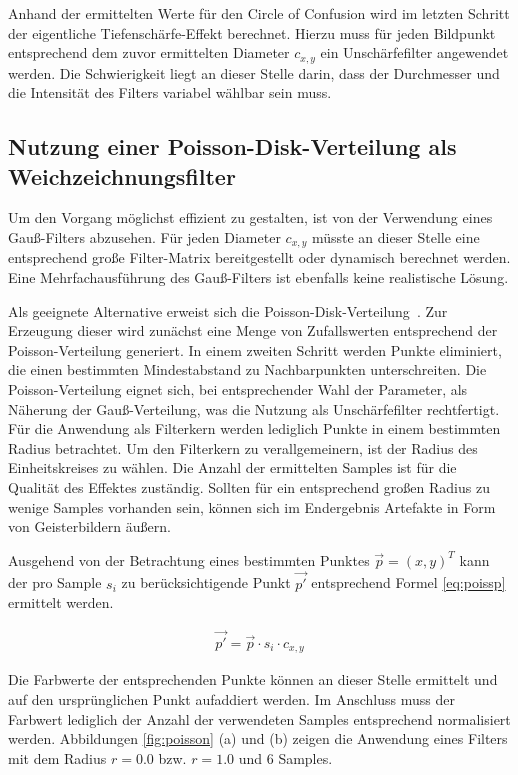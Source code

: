 \documentclass{acmsiggraph}                     %
\begin{document}
Anhand der ermittelten Werte für den Circle of Confusion wird im letzten Schritt der eigentliche Tiefenschärfe-Effekt berechnet. Hierzu muss für jeden Bildpunkt entsprechend dem zuvor ermittelten Diameter $c_{x,y}$ ein Unschärfefilter angewendet werden. Die Schwierigkeit liegt an dieser Stelle darin, dass der Durchmesser und die Intensität des Filters variabel wählbar sein muss.

\subsection{Nutzung einer Poisson-Disk-Verteilung als Weichzeichnungsfilter}

Um den Vorgang möglichst effizient zu gestalten, ist von der Verwendung eines Gauß-Filters abzusehen. Für jeden Diameter $c_{x,y}$ müsste an dieser Stelle eine entsprechend große Filter-Matrix bereitgestellt oder dynamisch berechnet werden. Eine Mehrfachausführung des Gauß-Filters ist ebenfalls keine realistische Lösung.

Als geeignete Alternative erweist sich die Poisson-Disk-Verteilung~\cite{Engel:2004uq}. Zur Erzeugung dieser wird zunächst eine Menge von Zufallswerten entsprechend der Poisson-Verteilung generiert. In einem zweiten Schritt werden Punkte eliminiert, die einen bestimmten Mindestabstand zu Nachbarpunkten unterschreiten. Die Poisson-Verteilung eignet sich, bei entsprechender Wahl der Parameter, als Näherung der Gauß-Verteilung, was die Nutzung als Unschärfefilter rechtfertigt. Für die Anwendung als Filterkern werden lediglich Punkte in einem bestimmten Radius betrachtet. Um den Filterkern zu verallgemeinern, ist der Radius des Einheitskreises zu wählen. Die Anzahl der ermittelten Samples ist für die Qualität des Effektes zuständig. Sollten für ein entsprechend großen Radius zu wenige Samples vorhanden sein, können sich im Endergebnis Artefakte in Form von Geisterbildern äußern.

Ausgehend von der Betrachtung eines bestimmten Punktes $\vec{p} = \left(x,y\right)^T$ kann der pro Sample $s_{i}$ zu berücksichtigende Punkt $\vec{p'}$ entsprechend Formel \ref{eq:poissp} ermittelt werden.

\begin{align}
	 \label{eq:poissp}
	\vec{p'} = \vec{p} \cdot s_i \cdot c_{x,y}
\end{align}

Die Farbwerte der entsprechenden Punkte können an dieser Stelle ermittelt und auf den ursprünglichen Punkt aufaddiert werden. Im Anschluss muss der Farbwert lediglich der Anzahl der verwendeten Samples entsprechend normalisiert werden. Abbildungen \ref{fig:poisson} (a) und (b) zeigen die Anwendung eines Filters mit dem Radius $r = 0.0$ bzw. $r = 1.0$ und 6 Samples.
\end{document}
